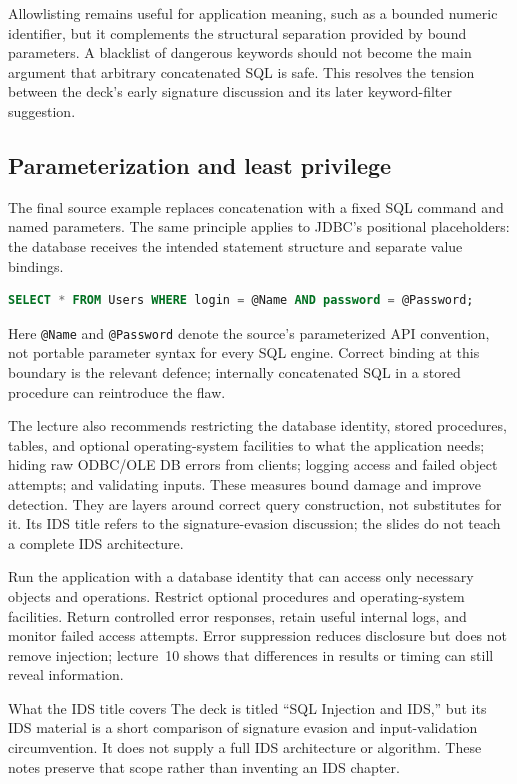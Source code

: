 \documentclass[11pt,a4paper]{article}
\numberwithin{figure}{section}
\begin{document}
Allowlisting remains useful for application meaning, such as a bounded numeric identifier, but it complements the structural separation provided by bound parameters. A blacklist of dangerous keywords should not become the main argument that arbitrary concatenated SQL is safe. This resolves the tension between the deck's early signature discussion and its later keyword-filter suggestion.

\subsection{Parameterization and least privilege}
The final source example replaces concatenation with a fixed SQL command and named parameters. The same principle applies to JDBC's positional placeholders: the database receives the intended statement structure and separate value bindings.
\begin{lstlisting}[language=SQL]
SELECT * FROM Users WHERE login = @Name AND password = @Password;
\end{lstlisting}
Here \texttt{@Name} and \texttt{@Password} denote the source's parameterized API convention, not portable parameter syntax for every SQL engine. Correct binding at this boundary is the relevant defence; internally concatenated SQL in a stored procedure can reintroduce the flaw.

The lecture also recommends restricting the database identity, stored procedures, tables, and optional operating-system facilities to what the application needs; hiding raw ODBC/OLE DB errors from clients; logging access and failed object attempts; and validating inputs. These measures bound damage and improve detection. They are layers around correct query construction, not substitutes for it. Its IDS title refers to the signature-evasion discussion; the slides do not teach a complete IDS architecture.

Run the application with a database identity that can access only necessary objects and operations. Restrict optional procedures and operating-system facilities. Return controlled error responses, retain useful internal logs, and monitor failed access attempts. Error suppression reduces disclosure but does not remove injection; lecture~10 shows that differences in results or timing can still reveal information.

\begin{technical}{What the IDS title covers}
The deck is titled ``SQL Injection and IDS,'' but its IDS material is a short comparison of signature evasion and input-validation circumvention. It does not supply a full IDS architecture or algorithm. These notes preserve that scope rather than inventing an IDS chapter.
\end{technical}
\end{document}
